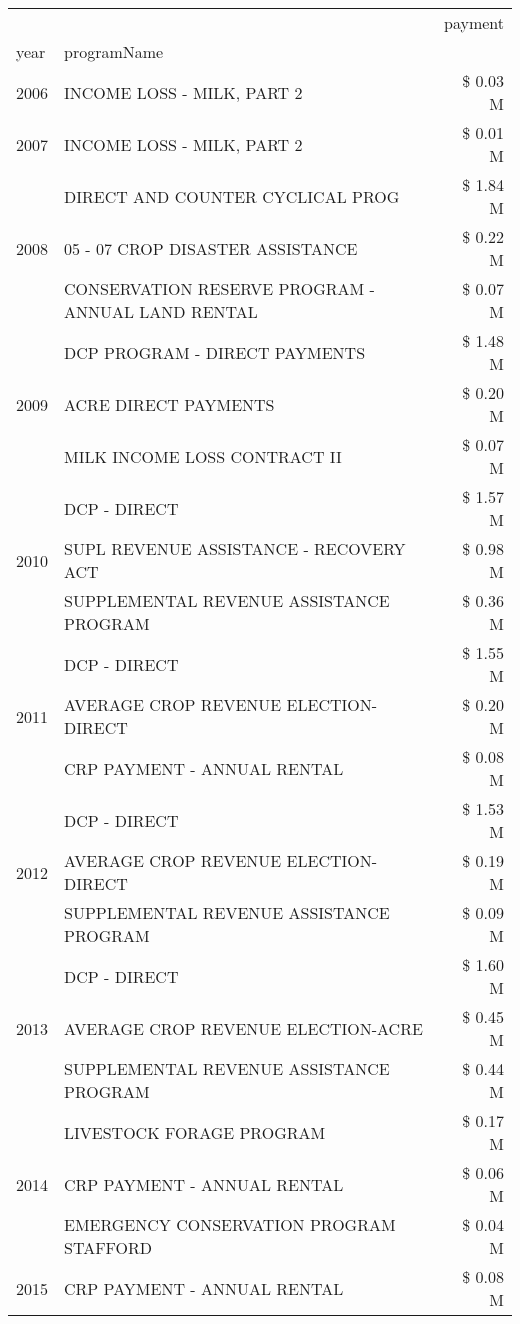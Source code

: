 \begin{tabular}{llr}
\toprule
 &  & payment \\
year & programName &  \\
\midrule
2006 & INCOME LOSS - MILK, PART 2 & \$ 0.03 M \\
\cline{1-3}
2007 & INCOME LOSS - MILK, PART 2 & \$ 0.01 M \\
\cline{1-3}
\multirow[t]{3}{*}{2008} & DIRECT AND COUNTER CYCLICAL PROG & \$ 1.84 M \\
 & 05 - 07 CROP DISASTER ASSISTANCE & \$ 0.22 M \\
 & CONSERVATION RESERVE PROGRAM - ANNUAL LAND RENTAL & \$ 0.07 M \\
\cline{1-3}
\multirow[t]{3}{*}{2009} & DCP PROGRAM - DIRECT PAYMENTS & \$ 1.48 M \\
 & ACRE DIRECT PAYMENTS & \$ 0.20 M \\
 & MILK INCOME LOSS CONTRACT II & \$ 0.07 M \\
\cline{1-3}
\multirow[t]{3}{*}{2010} & DCP - DIRECT & \$ 1.57 M \\
 & SUPL REVENUE ASSISTANCE - RECOVERY ACT & \$ 0.98 M \\
 & SUPPLEMENTAL REVENUE ASSISTANCE PROGRAM & \$ 0.36 M \\
\cline{1-3}
\multirow[t]{3}{*}{2011} & DCP - DIRECT & \$ 1.55 M \\
 & AVERAGE CROP REVENUE ELECTION-DIRECT & \$ 0.20 M \\
 & CRP PAYMENT - ANNUAL RENTAL & \$ 0.08 M \\
\cline{1-3}
\multirow[t]{3}{*}{2012} & DCP - DIRECT & \$ 1.53 M \\
 & AVERAGE CROP REVENUE ELECTION-DIRECT & \$ 0.19 M \\
 & SUPPLEMENTAL REVENUE ASSISTANCE PROGRAM & \$ 0.09 M \\
\cline{1-3}
\multirow[t]{3}{*}{2013} & DCP - DIRECT & \$ 1.60 M \\
 & AVERAGE CROP REVENUE ELECTION-ACRE & \$ 0.45 M \\
 & SUPPLEMENTAL REVENUE ASSISTANCE PROGRAM & \$ 0.44 M \\
\cline{1-3}
\multirow[t]{3}{*}{2014} & LIVESTOCK FORAGE PROGRAM & \$ 0.17 M \\
 & CRP PAYMENT - ANNUAL RENTAL & \$ 0.06 M \\
 & EMERGENCY CONSERVATION PROGRAM STAFFORD & \$ 0.04 M \\
\cline{1-3}
\multirow[t]{3}{*}{2015} & CRP PAYMENT - ANNUAL RENTAL & \$ 0.08 M \\

\end{tabular}
